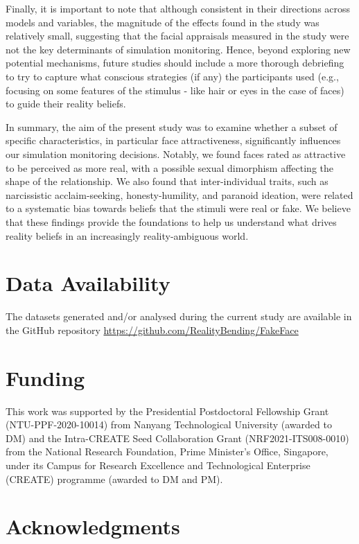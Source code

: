 \documentclass[
  man,floatsintext]{apa6}
\begin{document}
Finally, it is important to note that although consistent in their directions across models and variables, the magnitude of the effects found in the study was relatively small, suggesting that the facial appraisals measured in the study were not the key determinants of simulation monitoring. Hence, beyond exploring new potential mechanisms, future studies should include a more thorough debriefing to try to capture what conscious strategies (if any) the participants used (e.g., focusing on some features of the stimulus - like hair or eyes in the case of faces) to guide their reality beliefs.

In summary, the aim of the present study was to examine whether a subset of specific characteristics, in particular face attractiveness, significantly influences our simulation monitoring decisions. Notably, we found faces rated as attractive to be perceived as more real, with a possible sexual dimorphism affecting the shape of the relationship. We also found that inter-individual traits, such as narcissistic acclaim-seeking, honesty-humility, and paranoid ideation, were related to a systematic bias towards beliefs that the stimuli were real or fake. We believe that these findings provide the foundations to help us understand what drives reality beliefs in an increasingly reality-ambiguous world.

\hypertarget{data-availability}{%
\section{Data Availability}\label{data-availability}}

The datasets generated and/or analysed during the current study are available in the GitHub repository \url{https://github.com/RealityBending/FakeFace}

\hypertarget{funding}{%
\section{Funding}\label{funding}}

This work was supported by the Presidential Postdoctoral Fellowship Grant (NTU-PPF-2020-10014) from Nanyang Technological University (awarded to DM) and the Intra-CREATE Seed Collaboration Grant (NRF2021-ITS008-0010) from the National Research Foundation, Prime Minister's Office, Singapore, under its Campus for Research Excellence and Technological Enterprise (CREATE) programme (awarded to DM and PM).

\hypertarget{acknowledgments}{%
\section{Acknowledgments}\label{acknowledgments}}
\end{document}
